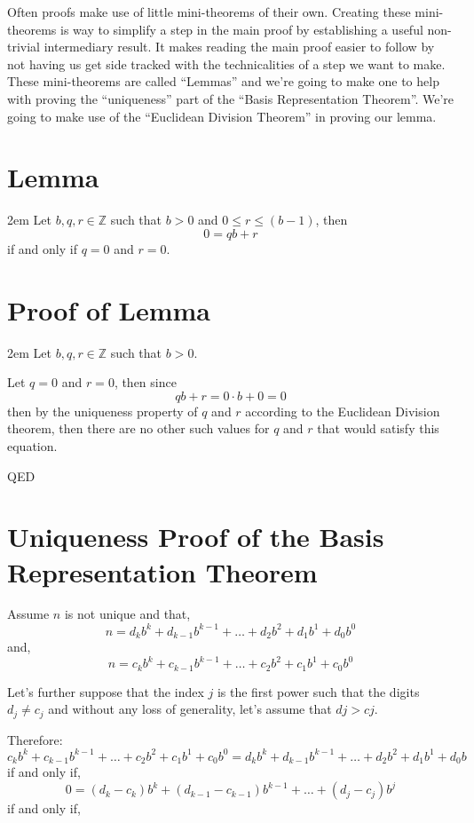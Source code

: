 \documentclass{article}
\newenvironment{jprIn}{\begin{adjustwidth}{2em}{}}{\end{adjustwidth}}
\begin{document}
Often proofs make use of little mini-theorems of their own.
Creating these mini-theorems is way to simplify a step in
the main proof by establishing a useful non-trivial
intermediary result. It makes reading the main proof
easier to follow by not having us get side tracked with
the technicalities of a step we want to make.
These mini-theorems are called ``Lemmas''
and we’re going to make one to help with proving the ``uniqueness'' part
of the ``Basis Representation Theorem''. We're going to make use of the
``Euclidean Division Theorem'' in proving our lemma.

\section*{Lemma}
\begin{jprIn}
Let $b, q, r \in{} \mathbb{Z}$ such that $b>0$ and $0\le{}r\le(b-1)$, then
\[0=qb+r\]
if and only if $q=0$ and $r=0$.
\end{jprIn}

\section*{Proof of Lemma}
\begin{jprIn}
Let $b, q, r \in{} \mathbb{Z}$ such that $b>0$.

Let $q=0$ and $r=0$, then since
\[qb+r=0\cdot{}b+0=0\]
then by the uniqueness property of $q$ and $r$ according to the Euclidean Division theorem,
then there are no other such values for $q$ and $r$ that would satisfy this equation.

QED
\end{jprIn}

\section*{Uniqueness Proof of the Basis Representation Theorem}

Assume $n$ is not unique and that,
\[n=d_kb^k+d_{k-1}b^{k-1}+\dots+d_2b^2+d_1b^1+d_0b^0\]
and,
\[n=c_kb^k+c_{k-1}b^{k-1}+\dots+c_2b^2+c_1b^1+c_0b^0\]

Let's further suppose that the index $j$ is the first power such that the digits $d_j\ne{}c_j$ and without any loss of generality,
let's assume that $dj>cj$.

Therefore:
\[c_kb^k+c_{k-1}b^{k-1}+\dots+c_2b^2+c_1b^1+c_0b^0=d_kb^k+d_{k-1}b^{k-1}+\dots+d_2b^2+d_1b^1+d_0b\]
if and only if,
\[0=(d_k-c_k)b^k+(d_{k-1}-c_{k-1})b^{k-1}+\dots+(d_j-c_j)b^j\]
if and only if,
\end{document}
